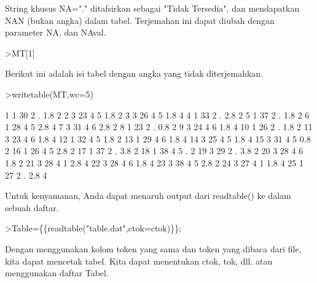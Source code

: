 \documentclass[12pt,arial,letterpaper]{book}
\begin{document}
\begin{eulernootebook}
\begin{eulercomment}
\begin{eulercomment}
\begin{eulernootebook}
\begin{eulercomment}
\begin{eulercomment}
\begin{eulercomment}
\begin{eulercomment}
\begin{eulercomment}
\begin{eulercomment}
\begin{eulercomment}
\begin{eulercomment}
String khusus NA="." ditafsirkan sebagai "Tidak Tersedia", dan
mendapatkan NAN (bukan angka) dalam tabel. Terjemahan ini dapat diubah
dengan parameter NA, dan NAval.
\end{eulercomment}
\begin{eulerprompt}
>MT[1]
\end{eulerprompt}
\begin{euleroutput}
  [1,  1,  30,  2,  NAN,  1.8,  2]
\end{euleroutput}
\begin{eulercomment}
Berikut ini adalah isi tabel dengan angka yang tidak diterjemahkan.
\end{eulercomment}
\begin{eulerprompt}
>writetable(MT,wc=5)
\end{eulerprompt}
\begin{euleroutput}
      1    1   30    2    .  1.8    2
      2    3   23    4    5  1.8    2
      3    3   26    4    5  1.8    4
      4    1   33    2    .  2.8    2
      5    1   37    2    .  1.8    2
      6    1   28    4    5  2.8    4
      7    3   31    4    6  2.8    2
      8    1   23    2    .  0.8    2
      9    3   24    4    6  1.8    4
     10    1   26    2    .  1.8    2
     11    3   23    4    6  1.8    4
     12    1   32    4    5  1.8    2
     13    1   29    4    6  1.8    4
     14    3   25    4    5  1.8    4
     15    3   31    4    5  0.8    2
     16    1   26    4    5  2.8    2
     17    1   37    2    .  3.8    2
     18    1   38    4    5    .    2
     19    3   29    2    .  3.8    2
     20    3   28    4    6  1.8    2
     21    3   28    4    1  2.8    4
     22    3   28    4    6  1.8    4
     23    3   38    4    5  2.8    2
     24    3   27    4    1  1.8    4
     25    1   27    2    .  2.8    4
\end{euleroutput}
\begin{eulercomment}
Untuk kenyamanan, Anda dapat menaruh output dari readtable() ke dalam
sebuah daftar.
\end{eulercomment}
\begin{eulerprompt}
>Table=\{\{readtable("table.dat",ctok=ctok)\}\};
\end{eulerprompt}
\begin{eulercomment}
Dengan menggunakan kolom token yang sama dan token yang dibaca dari
file, kita dapat mencetak tabel. Kita dapat menentukan ctok, tok, dll.
atau menggunakan daftar Tabel.
\end{eulercomment}
\begin{eulerprompt}

\end{eulerprompt}
\end{eulercomment}
\end{eulercomment}
\end{eulercomment}
\end{eulercomment}
\end{eulercomment}
\end{eulercomment}
\end{eulercomment}
\end{eulernootebook}
\end{eulercomment}
\end{eulercomment}
\end{eulernootebook}
\end{document}
